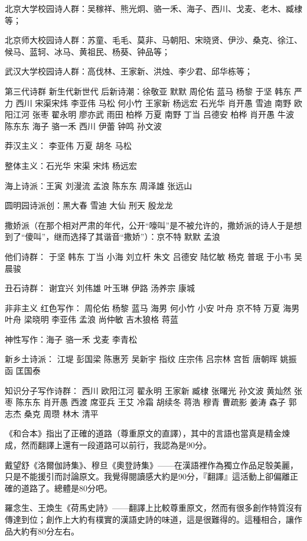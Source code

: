 \documentclass[UTF8]{../../RepresentationUniverse}
\begin{document}
北京大学校园诗人群：吴稼祥、熊光炯、骆一禾、海子、西川、戈麦、老木、臧棣等；

北京师大校园诗人群：苏童、毛毛、莫非、马朝阳、宋晓贤、伊沙、桑克、徐江、候马、蓝轲、冰马、黄祖民、杨葵、钟品等；

武汉大学校园诗人群：高伐林、王家新、洪烛、李少君、邱华栋等；


第三代诗群 新生代新世代 后新诗潮：徐敬亚 默默 周伦佑 蓝马 杨黎 于坚 韩东 严力 西川 宋渠宋炜 李亚伟 马松 何小竹 王家新 杨远宏 石光华 肖开愚 雪迪 南野 欧阳江河 张枣 翟永明 廖亦武 雨田 柏桦 万夏 南野 丁当 吕德安 柏桦 肖开愚 牛波 陈东东 海子 骆一禾 西川 伊蕾 钟鸣 孙文波

莽汉主义： 李亚伟 万夏 胡冬 马松

整体主义：石光华 宋渠 宋炜 杨远宏

海上诗派：王寅 刘漫流 孟浪 陈东东 周泽雄 张远山

圆明园诗派创：黑大春 雪迪 大仙 刑天 殷龙龙


撒娇派（在那个相对严肃的年代，公开“嚎叫”是不被允许的，撒娇派的诗人于是想到了“傻叫”，继而选择了其谐音“撒娇”）：京不特 默默 孟浪

他们诗群： 于坚 韩东 丁当 小海 刘立杆 朱文 吕德安 陆忆敏 杨克 普珉 于小韦 吴晨骏


丑石诗群： 谢宜兴 刘伟雄 叶玉琳 伊路 汤养宗 康城


非非主义 红色写作： 周伦佑 杨黎 蓝马 海男 何小竹 小安 叶舟 京不特 万夏 海男 叶舟 梁晓明 李亚伟 孟浪 尚仲敏 吉木狼格 蒋蓝


神性写作：海子 骆一禾 戈麦 李青松

新乡土诗派： 江堤 彭国梁 陈惠芳 吴新宇 指纹 庄宗伟 吕宗林 宫哲 唐朝晖 姚振函 匡国泰


知识分子写作诗群： 西川 欧阳江河 翟永明 王家新 臧棣 张曙光 孙文波 黄灿然 张枣 陈东东 肖开愚 西渡 席亚兵 王艾 冷霜 胡续冬 蒋浩 穆青 曹疏影 姜涛 森子 郭志杰 桑克 周瓒 林木 清平

 









《和合本》指出了正確的道路（尊重原文的直譯），其中的言語也當真是精金煉成，然而翻譯上還有一段道路可以前行，我認為是90分。


戴望舒《洛爾伽詩集》、穆旦《奧登詩集》——在漢語裡作為獨立作品足彀美麗，只是不能援引而討論原文。我覺得閱讀感大約是90分，『翻譯』這活動上卻偏離正確的道路了。總體是80分吧。


羅念生、王煥生《荷馬史詩》——翻譯上比較尊重原文，然而有很多創作特質沒有傳達到位；創作上大約有樸實的漢語史詩的味道，這是很難得的。這種相合，讓作品大約有80分左右。
\end{document}
